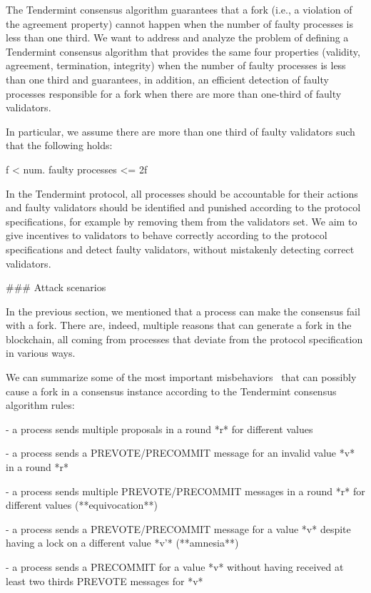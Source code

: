 \documentclass[a4paper,11pt,oneside]{report}
\begin{document}
\begin{markdown}
The Tendermint consensus algorithm guarantees that a fork (i.e., a violation of the agreement property) cannot happen when the number of faulty processes is less than one third.
We want to address and analyze the problem of defining a Tendermint consensus algorithm that provides the same four properties (validity, agreement, termination, integrity) when the number of faulty processes is less than one third and guarantees, in addition, an efficient detection of faulty processes responsible for a fork when there are more than one-third of faulty validators.

In particular, we assume there are more than one third of faulty validators such that the following holds:

    f < num. faulty processes <= 2f

In the Tendermint protocol, all processes should be accountable for their actions and faulty validators should be identified and punished according to the protocol specifications, for example by removing them from the validators set.
We aim to give incentives to validators to behave correctly according to the protocol specifications and detect faulty validators, without mistakenly detecting correct validators. 
 
### Attack scenarios
 
In the previous section, we mentioned that a process can make the consensus fail with a fork. There are, indeed, multiple reasons that can generate a fork in the blockchain, all coming from processes that deviate from the protocol specification in various ways.

We can summarize some of the most important misbehaviors~\cite{fork-accountability-overview} that can possibly cause a fork in a consensus instance according to the Tendermint consensus algorithm rules: 

- a process sends multiple proposals in a round *r* for different values 

- a process sends a PREVOTE/PRECOMMIT message for an invalid value *v* in a round *r*

- a process sends multiple PREVOTE/PRECOMMIT messages in a round *r* for different values (**equivocation**)

- a process sends a PREVOTE/PRECOMMIT message for a value *v* despite having a lock on a different value *v'* (**amnesia**)

- a process sends a PRECOMMIT for a value *v* without having received at least two thirds PREVOTE messages for *v* 

\end{markdown}
\end{document}
